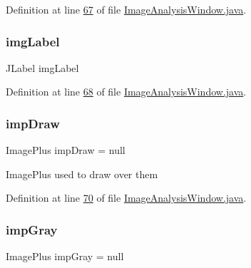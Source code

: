 Definition at line \hyperlink{_image_analysis_window_8java_source_l00067}{67} of file \hyperlink{_image_analysis_window_8java_source}{Image\+Analysis\+Window.\+java}.

\hypertarget{classgui_1_1_image_analysis_window_a2a216fd8d92687a0d71b6064e26a3412}{}\label{classgui_1_1_image_analysis_window_a2a216fd8d92687a0d71b6064e26a3412} 
\subsubsection{\texorpdfstring{img\+Label}{imgLabel}}
{\footnotesize\ttfamily J\+Label img\+Label\hspace{0.3cm}{\ttfamily [private]}}



Definition at line \hyperlink{_image_analysis_window_8java_source_l00068}{68} of file \hyperlink{_image_analysis_window_8java_source}{Image\+Analysis\+Window.\+java}.

\hypertarget{classgui_1_1_image_analysis_window_a4f0c94772d72a249a499259f6e49c7f0}{}\label{classgui_1_1_image_analysis_window_a4f0c94772d72a249a499259f6e49c7f0} 
\subsubsection{\texorpdfstring{imp\+Draw}{impDraw}}
{\footnotesize\ttfamily Image\+Plus imp\+Draw = null\hspace{0.3cm}{\ttfamily [protected]}}

Image\+Plus used to draw over them 

Definition at line \hyperlink{_image_analysis_window_8java_source_l00070}{70} of file \hyperlink{_image_analysis_window_8java_source}{Image\+Analysis\+Window.\+java}.

\hypertarget{classgui_1_1_image_analysis_window_a2f930a4d42790d6f5eec90929df33416}{}\label{classgui_1_1_image_analysis_window_a2f930a4d42790d6f5eec90929df33416} 
\subsubsection{\texorpdfstring{imp\+Gray}{impGray}}
{\footnotesize\ttfamily Image\+Plus imp\+Gray = null\hspace{0.3cm}{\ttfamily [protected]}}

